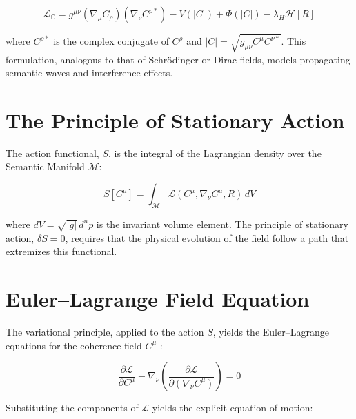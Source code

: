 \begin{equation}
\mathcal{L}_{\mathbb{C}} = g^{\mu\nu} (\nabla_\mu C_\rho)(\nabla_\nu C^{\rho*}) - V(|C|) + \Phi(|C|) - \lambda_H \mathcal{H}[R]
\end{equation}

where \(C^{\rho*}\) is the complex conjugate of \(C^\rho\) and \(|C| = \sqrt{g_{\mu\nu} C^\mu C^{\nu*}}\). This formulation, analogous to that of Schrödinger or Dirac fields, models propagating semantic waves and interference effects.


\section{The Principle of Stationary Action}
\label{6.3:the_principle_of_stationary_action}

The action functional, \(S\), is the integral of the Lagrangian density over the Semantic Manifold \(\mathcal{M}\):

\begin{equation}
S[C^\mu] = \int_{\mathcal{M}} \mathcal{L}(C^\mu, \nabla_\nu C^\mu, R) \, dV
\end{equation}

where \(dV = \sqrt{|g|} \, d^n p\) is the invariant volume element. The principle of stationary action, \(\delta S = 0\), requires that the physical evolution of the field follow a path that extremizes this functional.


\section{Euler–Lagrange Field Equation}
\label{6.4:euler_lagrange_field_equation}

The variational principle, applied to the action \(S\), yields the Euler–Lagrange equations for the coherence field \(C^\mu\) \autocite{Euler1744, Lagrange1788}:

\begin{equation}
\frac{\partial \mathcal{L}}{\partial C^\mu} - \nabla_\nu \left( \frac{\partial \mathcal{L}}{\partial (\nabla_\nu C^\mu)} \right) = 0
\end{equation}

Substituting the components of \(\mathcal{L}\) yields the explicit equation of motion:

